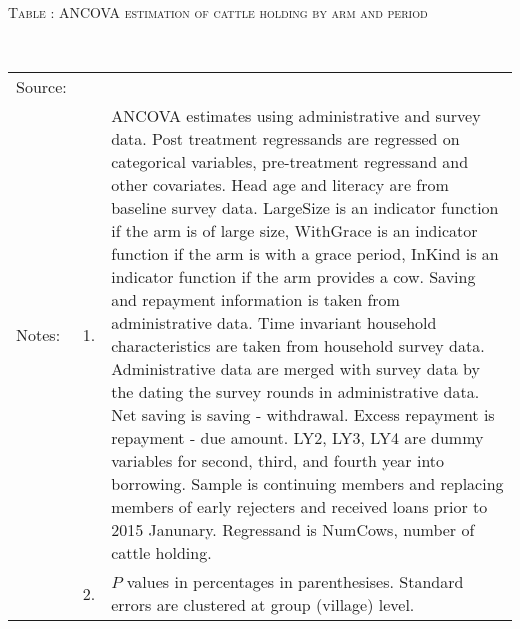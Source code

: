 \hspace{-1cm}\begin{minipage}[t]{14cm}
\hfil\textsc{\normalsize Table \thetable: ANCOVA estimation of cattle holding by arm and period\label{tab ANCOVA cow time varying}}\\
\setlength{\tabcolsep}{1pt}
\setlength{\baselineskip}{8pt}
\renewcommand{\arraystretch}{.55}
\hfil{}\\
\renewcommand{\arraystretch}{.8}
\setlength{\tabcolsep}{1pt}
\begin{tabular}{>{\hfill\scriptsize}p{1cm}<{}>{\hfill\scriptsize}p{.25cm}<{}>{\scriptsize}p{12cm}<{\hfill}}
Source:& \multicolumn{2}{l}{\scriptsize Estimated with GUK administrative and survey data.}\\
Notes: & 1. & ANCOVA estimates using administrative and survey data. Post treatment regressands are regressed on categorical variables, pre-treatment regressand and other covariates. Head age and literacy are from baseline survey data.  \textsf{LargeSize} is an indicator function if the arm is of large size, \textsf{WithGrace} is an indicator function if the arm is with a grace period, \textsf{InKind} is an indicator function if the arm provides a cow. Saving and repayment information is taken from administrative data. Time invariant household characteristics are taken from household survey data. Administrative data are merged with survey data by the dating the survey rounds in administrative data. Net saving is saving - withdrawal. Excess repayment is repayment - due amount. \textsf{LY2, LY3, LY4} are dummy variables for second, third, and 	fourth year into borrowing. Sample is continuing members and replacing members of early rejecters and received loans prior to 2015 Janunary. Regressand is \textsf{NumCows}, number of cattle holding. \\
& 2. & $P$ values in percentages in parenthesises. Standard errors are clustered at group (village) level.
\end{tabular}
\end{minipage}

